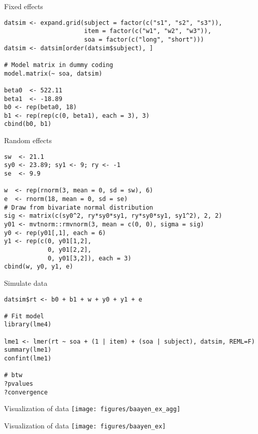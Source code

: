 \documentclass[aspectratio=169]{beamer}
\begin{document}
{

\begin{frame}[fragile]{Fixed effects}
  \begin{lstlisting}
datsim <- expand.grid(subject = factor(c("s1", "s2", "s3")),
                      item = factor(c("w1", "w2", "w3")),
                      soa = factor(c("long", "short")))
datsim <- datsim[order(datsim$subject), ]

# Model matrix in dummy coding
model.matrix(~ soa, datsim)

beta0  <- 522.11
beta1  <- -18.89
b0 <- rep(beta0, 18)
b1 <- rep(rep(c(0, beta1), each = 3), 3)
cbind(b0, b1)
  \end{lstlisting}
\end{frame}

\begin{frame}[fragile]{Random effects}
  \begin{lstlisting}
sw  <- 21.1
sy0 <- 23.89; sy1 <- 9; ry <- -1
se  <- 9.9

w  <- rep(rnorm(3, mean = 0, sd = sw), 6)
e  <- rnorm(18, mean = 0, sd = se)
# Draw from bivariate normal distribution
sig <- matrix(c(sy0^2, ry*sy0*sy1, ry*sy0*sy1, sy1^2), 2, 2)
y01 <- mvtnorm::rmvnorm(3, mean = c(0, 0), sigma = sig)
y0 <- rep(y01[,1], each = 6)
y1 <- rep(c(0, y01[1,2],
            0, y01[2,2],
            0, y01[3,2]), each = 3)
cbind(w, y0, y1, e)
  \end{lstlisting}
\end{frame}

\begin{frame}[fragile]{Simulate data}
  \begin{lstlisting}
datsim$rt <- b0 + b1 + w + y0 + y1 + e

# Fit model
library(lme4)

lme1 <- lmer(rt ~ soa + (1 | item) + (soa | subject), datsim, REML=F)
summary(lme1)
confint(lme1)

# btw
?pvalues
?convergence
  \end{lstlisting}
\end{frame}

}

\begin{frame}{Visualization of data}
  \centering
\texttt{[image: figures/baayen\_ex\_agg]}
\end{frame}

\begin{frame}{Visualization of data}
\texttt{[image: figures/baayen\_ex]}
\end{frame}
\end{document}
